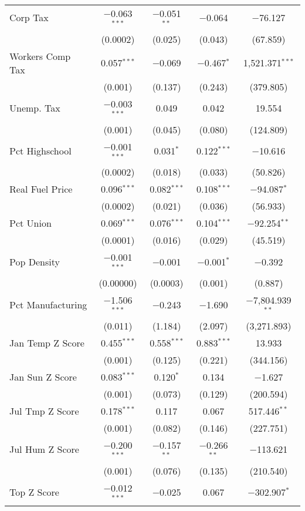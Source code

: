 \begin{table}[!htbp]
\begin{tabular}{@{\extracolsep{5pt}}lcccc}
  Corp Tax & $-$0.063$^{***}$ & $-$0.051$^{**}$ & $-$0.064 & $-$76.127 \\ 
  & (0.0002) & (0.025) & (0.043) & (67.859) \\ 
  Workers Comp Tax & 0.057$^{***}$ & $-$0.069 & $-$0.467$^{*}$ & 1,521.371$^{***}$ \\ 
  & (0.001) & (0.137) & (0.243) & (379.805) \\ 
  Unemp. Tax & $-$0.003$^{***}$ & 0.049 & 0.042 & 19.554 \\ 
  & (0.001) & (0.045) & (0.080) & (124.809) \\ 
  Pct Highschool & $-$0.001$^{***}$ & 0.031$^{*}$ & 0.122$^{***}$ & $-$10.616 \\ 
  & (0.0002) & (0.018) & (0.033) & (50.826) \\ 
  Real Fuel Price & 0.096$^{***}$ & 0.082$^{***}$ & 0.108$^{***}$ & $-$94.087$^{*}$ \\ 
  & (0.0002) & (0.021) & (0.036) & (56.933) \\ 
  Pct Union & 0.069$^{***}$ & 0.076$^{***}$ & 0.104$^{***}$ & $-$92.254$^{**}$ \\ 
  & (0.0001) & (0.016) & (0.029) & (45.519) \\ 
  Pop Density & $-$0.001$^{***}$ & $-$0.001 & $-$0.001$^{*}$ & $-$0.392 \\ 
  & (0.00000) & (0.0003) & (0.001) & (0.887) \\ 
  Pct Manufacturing & $-$1.506$^{***}$ & $-$0.243 & $-$1.690 & $-$7,804.939$^{**}$ \\ 
  & (0.011) & (1.184) & (2.097) & (3,271.893) \\ 
  Jan Temp Z Score & 0.455$^{***}$ & 0.558$^{***}$ & 0.883$^{***}$ & 13.933 \\ 
  & (0.001) & (0.125) & (0.221) & (344.156) \\ 
  Jan Sun Z Score & 0.083$^{***}$ & 0.120$^{*}$ & 0.134 & $-$1.627 \\ 
  & (0.001) & (0.073) & (0.129) & (200.594) \\ 
  Jul Tmp Z Score & 0.178$^{***}$ & 0.117 & 0.067 & 517.446$^{**}$ \\ 
  & (0.001) & (0.082) & (0.146) & (227.751) \\ 
  Jul Hum Z Score & $-$0.200$^{***}$ & $-$0.157$^{**}$ & $-$0.266$^{**}$ & $-$113.621 \\ 
  & (0.001) & (0.076) & (0.135) & (210.540) \\ 
  Top Z Score & $-$0.012$^{***}$ & $-$0.025 & 0.067 & $-$302.907$^{*}$ \\ 

\end{tabular}
\end{table}
